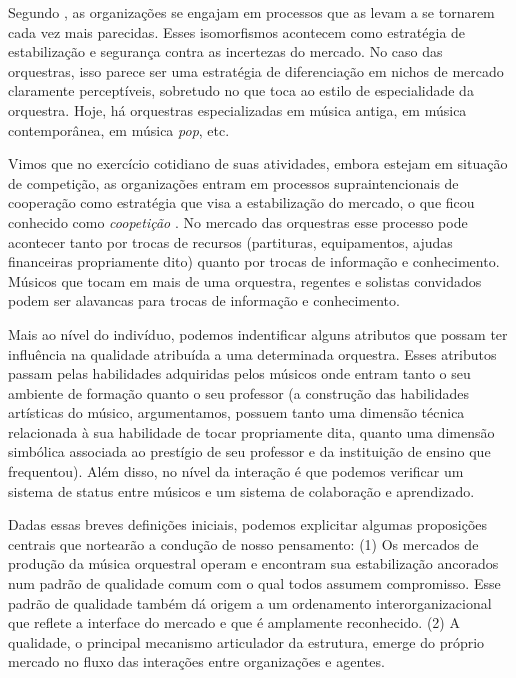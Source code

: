 \documentclass[a4paper, 12pt, openright, oneside, german, french, english, brazil]{abntex2}
\begin{document}
	Segundo , as organizações se engajam em processos que as levam a se tornarem cada vez mais parecidas. Esses isomorfismos acontecem como estratégia de estabilização e segurança contra as incertezas do mercado. No caso das orquestras, isso parece ser uma estratégia de diferenciação em nichos de mercado claramente perceptíveis, sobretudo no que toca ao estilo de especialidade da orquestra. Hoje, há orquestras especializadas em música antiga, em música contemporânea, em música \textit{pop}, etc.


	Vimos que no exercício cotidiano de suas atividades, embora estejam em situação de competição, as organizações entram em processos supraintencionais de cooperação como estratégia que visa a estabilização do mercado, o que ficou conhecido como \textit{coopetição} \cite{lazega2009theorie}. No mercado das orquestras esse processo pode acontecer tanto por trocas de recursos (partituras, equipamentos, ajudas financeiras propriamente dito) quanto por trocas de informação e conhecimento. Músicos que tocam em mais de uma orquestra, regentes e solistas convidados podem ser alavancas para trocas de informação e conhecimento.

	Mais ao nível do indivíduo, podemos indentificar alguns atributos que possam ter influência na qualidade atribuída a uma determinada orquestra. Esses atributos passam pelas habilidades adquiridas pelos músicos onde entram tanto o seu ambiente de formação quanto o seu professor (a construção das habilidades artísticas do músico, argumentamos, possuem tanto uma dimensão técnica relacionada à sua habilidade de tocar propriamente dita, quanto uma dimensão simbólica associada ao prestígio de seu professor e da instituição de ensino que frequentou). Além disso, no nível da interação é que podemos verificar um sistema de status entre músicos e um sistema de colaboração e aprendizado.

	Dadas essas breves definições iniciais, podemos explicitar algumas proposições centrais que nortearão a condução de nosso pensamento: (1) Os mercados de produção da música orquestral operam e encontram sua estabilização ancorados num padrão de qualidade comum com o qual todos assumem compromisso. Esse padrão de qualidade também dá origem a um ordenamento interorganizacional que reflete a interface do mercado e que é amplamente reconhecido. (2) A qualidade, o principal mecanismo articulador da estrutura, emerge do próprio mercado no fluxo das interações entre organizações e agentes. 
\end{document}
